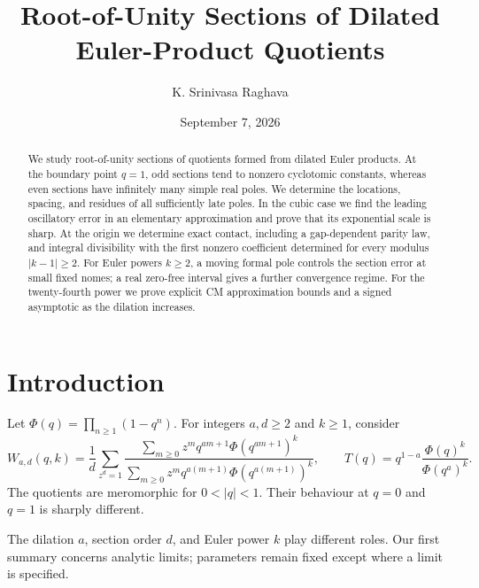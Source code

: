 \documentclass[11pt]{amsart}
\title[Root-of-Unity Sections of Dilated Euler-Product Quotients]{Root-of-Unity Sections of Dilated Euler-Product Quotients}
\author{K. Srinivasa Raghava}
\date{September 7, 2026}
\theoremstyle{definition}
\theoremstyle{remark}
\numberwithin{equation}{section}
\begin{document}
\begin{abstract}
We study root-of-unity sections of quotients formed from dilated Euler products. At the boundary point $q=1$, odd sections tend to nonzero cyclotomic constants, whereas even sections have infinitely many simple real poles. We determine the locations, spacing, and residues of all sufficiently late poles. In the cubic case we find the leading oscillatory error in an elementary approximation and prove that its exponential scale is sharp. At the origin we determine exact contact, including a gap-dependent parity law, and integral divisibility with the first nonzero coefficient determined for every modulus $|k-1|\ge2$. For Euler powers $k\ge2$, a moving formal pole controls the section error at small fixed nomes; a real zero-free interval gives a further convergence regime. For the twenty-fourth power we prove explicit CM approximation bounds and a signed asymptotic as the dilation increases.
\end{abstract}
\maketitle

\section{Introduction}
Let $\Phi(q)=\prod_{n\ge1}(1-q^n)$. For integers $a,d\ge2$ and $k\ge1$, consider
\begin{equation}\label{introW}
 W_{a,d}(q,k)=\frac1d\sum_{z^d=1}
 \frac{\sum_{m\ge0}z^mq^{am+1}\Phi(q^{am+1})^k}
      {\sum_{m\ge0}z^mq^{a(m+1)}\Phi(q^{a(m+1)})^k},
 \qquad
 T(q)=q^{1-a}\frac{\Phi(q)^k}{\Phi(q^a)^k}.
\end{equation}
The quotients are meromorphic for $0<|q|<1$. Their behaviour at $q=0$ and $q=1$ is sharply different.

The dilation $a$, section order $d$, and Euler power $k$ play different roles. Our first summary concerns analytic limits; parameters remain fixed except where a limit is specified.
\end{document}
